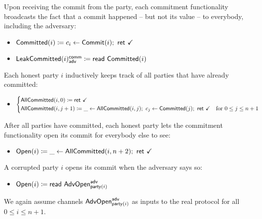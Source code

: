 Upon receiving the commit from the party, each commitment functionality broadcasts the fact that a commit happened -- but not its value -- to everybody, including the adversary:
\begin{itemize}
\item {\color{magenta} $\mathsf{Committed}(i) \coloneqq c_i \leftarrow \mathsf{Commit}(i); \ \mathsf{ret} \ \checkmark$}
\item {\color{magenta} $\mathsf{LeakCommitted}(i)^{\mathsf{comm}}_{\mathsf{adv}} \coloneqq \mathsf{read} \ \mathsf{Committed}(i)$}
\end{itemize}
Each honest party $i$ inductively keeps track of all parties that have already committed:
\begin{itemize}
\item {\color{magenta} $\begin{cases*} \AllCommitted(i,0) \coloneqq \ret{\checkmark} & \\ \AllCommitted(i,j+1) \coloneqq \_ \leftarrow \AllCommitted(i,j); \ c_j \leftarrow \Committed(j); \ \ret{\checkmark} & \text{for $0 \leq j \leq n+1$} \end{cases*}$}
\end{itemize}
After all parties have committed, each honest party lets the commitment functionality open its commit for everybody else to see:
\begin{itemize}
\item {\color{teal} $\Open(i) \coloneqq \_ \leftarrow \AllCommitted(i,n+2); \ \ret{\checkmark}$}
\end{itemize}
A corrupted party $i$ opens its commit when the adversary says so:
\begin{itemize}
\item {\color{teal} $\mathsf{Open}(i) \coloneqq \mathsf{read} \ \mathsf{AdvOpen}^{\mathsf{adv}}_{\mathsf{party}(i)}$}
\end{itemize}
We again assume channels $\mathsf{AdvOpen}^{\mathsf{adv}}_{\mathsf{party}(i)}$ as inputs to the real protocol for all $0 \leq i \leq n+1$.

